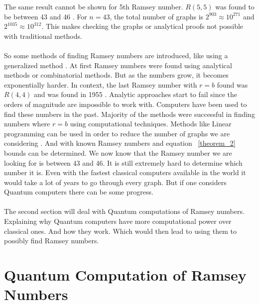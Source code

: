 \documentclass[15pt, a4paper]{Assignment}
\begin{document}
The same result cannot be shown for 5th Ramsey number.
$R(5,5)$ was found to be between 43\cite{Exoo1993} and 46 \cite{angeltveit2024r55le46}.
For $n= 43$, the total number of graphs is $2^{903} \approx 10^{271}$ and  $2^{1035}\approx10^{312}$.
This makes checking the graphs or analytical proofs not possible with traditional methods.
\\\\
So some methods of finding Ramsey numbers are introduced, like using a generalized method \cite{burr1981generalized}. 
At first Ramsey numbers were found using analytical methods or combinatorial methods.
But as the numbers grow, it becomes exponentially harder.
In context, the last Ramsey number with $r=b$ found was $R(4,4)$ and was found in 1955 \cite{GreenwoodGleason1955}.
Analytic approaches start to fail since the orders of magnitude are impossible to work with.
Computers have been used to find these numbers in the past.
Majority of the methods were successful in finding numbers where $r=b$ using computational techniques.
Methods like Linear programming can be used in order to reduce the number of graphs we are considering \cite{angeltveit2024r55le46}.
And with known Ramsey numbers and equation ~\ref{theorem_2} bounds can be determined.
We now know that the Ramsey number we are looking for is between 43 and 46.
It is still extremely hard to determine which number it is.
Even with the fastest classical computers available in the world it would take a lot of years to go through every graph.
But if one considers Quantum computers there can be some progress.
\\\\
The second section will deal with Quantum computations of Ramsey numbers.
Explaining why Quantum computers have more computational power over classical ones.
And how they work.	
Which would then lead to using them to possibly find Ramsey numbers.
\section{Quantum Computation of Ramsey Numbers}
\end{document}
